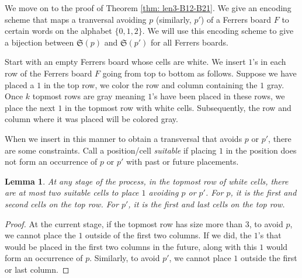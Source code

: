 \documentclass[12pt, english, a4paper]{article}
\newcommand{\Av}{\mathfrak{S}}
\theoremstyle{plain}
\newtheorem{lemma}[theorem]{Lemma}
\theoremstyle{definition}
\theoremstyle{remark}
\begin{document}
We move on to the proof of Theorem \ref{thm: len3-B12-B21}. We give an encoding scheme that maps a tranversal avoiding $p$ (similarly, $p'$) of a Ferrers board $F$ to certain words on the alphabet $\{0,1,2\}$. We will use this encoding scheme to give a bijection between $\Av(p)$ and $\Av(p')$ for all Ferrers boards.

Start with an empty Ferrers board whose cells are white. We insert $1$'s in each row of the Ferrers board $F$ going from top to bottom as follows. Suppose we have placed a $1$ in the top row, we color the row and column containing the $1$ gray. Once $k$ topmost rows are gray meaning $1$'s have been placed in these rows, we place the next $1$ in the topmost row with white cells. Subsequently, the row and column where it was placed will be colored gray.

When we insert in this manner to obtain a transversal that avoids $p$ or $p'$, there are some constraints. Call a position/cell \emph{suitable} if placing $1$ in the position does not form an occurrence of $p$ or $p'$ with past or future placements.

\begin{lemma}\label{lem: atmost2}
At any stage of the process, in the topmost row of white cells, there are at most two suitable cells to place $1$ avoiding $p$ or $p'$. For $p$, it is the first and second cells on the top row. For $p'$, it is the first and last cells on the top row.
\end{lemma}
\begin{proof} At the current stage, if the topmost row has size more than $3$, to avoid $p$, we cannot place the $1$ outside of the first two columns. If we did, the $1$'s that would be placed in the first two columns in the future, along with this $1$ would form an occurrence of $p$.
Similarly, to avoid $p'$, we cannot place $1$ outside the first or last column. 
\end{proof}
\end{document}
